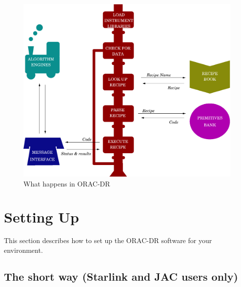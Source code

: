 \documentclass[twoside,11pt]{article}
\newcommand{\underscore}{\leavevmode\kern.04em\vbox{\hrule width 0.4em height 0.3pt}}
\newcommand{\xlabel}[1]{}
\renewcommand{\_}{\texttt{\symbol{95}}}
\begin{document}
\begin{figure}
\includegraphics[width=\textwidth]{sun230_train.eps}
\caption{What happens in ORAC-DR}
\end{figure}




\section{Setting Up\xlabel{setting_up}}%

This section describes how to set up the ORAC-DR software for your
environment.

\subsection*{The short way (Starlink and JAC users only)}%
\end{document}
